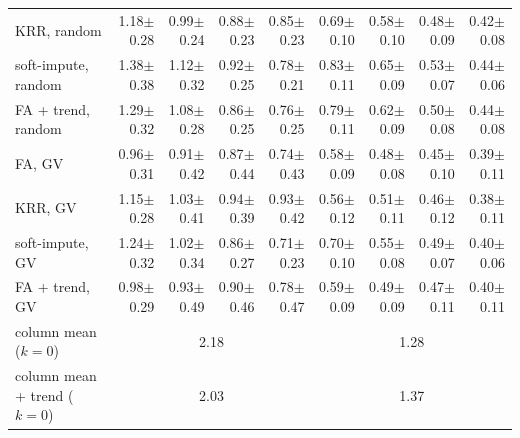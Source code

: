 \begin{tabular}{lrrrrrrrr}
KRR, random & 1.18{\tiny$\pm$0.28} & 0.99{\tiny$\pm$0.24} & 0.88{\tiny$\pm$0.23} & 0.85{\tiny$\pm$0.23} & 0.69{\tiny$\pm$0.10} & 0.58{\tiny$\pm$0.10} & 0.48{\tiny$\pm$0.09} & 0.42{\tiny$\pm$0.08} \\
soft-impute, random & 1.38{\tiny$\pm$0.38} & 1.12{\tiny$\pm$0.32} & 0.92{\tiny$\pm$0.25} & 0.78{\tiny$\pm$0.21} & 0.83{\tiny$\pm$0.11} & 0.65{\tiny$\pm$0.09} & 0.53{\tiny$\pm$0.07} & 0.44{\tiny$\pm$0.06} \\
FA + trend, random & 1.29{\tiny$\pm$0.32} & 1.08{\tiny$\pm$0.28} & 0.86{\tiny$\pm$0.25} & 0.76{\tiny$\pm$0.25} & 0.79{\tiny$\pm$0.11} & 0.62{\tiny$\pm$0.09} & 0.50{\tiny$\pm$0.08} & 0.44{\tiny$\pm$0.08} \\
FA, GV & 0.96{\tiny$\pm$0.31} & 0.91{\tiny$\pm$0.42} & 0.87{\tiny$\pm$0.44} & 0.74{\tiny$\pm$0.43} & 0.58{\tiny$\pm$0.09} & 0.48{\tiny$\pm$0.08} & 0.45{\tiny$\pm$0.10} & 0.39{\tiny$\pm$0.11} \\
KRR, GV & 1.15{\tiny$\pm$0.28} & 1.03{\tiny$\pm$0.41} & 0.94{\tiny$\pm$0.39} & 0.93{\tiny$\pm$0.42} & 0.56{\tiny$\pm$0.12} & 0.51{\tiny$\pm$0.11} & 0.46{\tiny$\pm$0.12} & 0.38{\tiny$\pm$0.11} \\
soft-impute, GV & 1.24{\tiny$\pm$0.32} & 1.02{\tiny$\pm$0.34} & 0.86{\tiny$\pm$0.27} & 0.71{\tiny$\pm$0.23} & 0.70{\tiny$\pm$0.10} & 0.55{\tiny$\pm$0.08} & 0.49{\tiny$\pm$0.07} & 0.40{\tiny$\pm$0.06} \\
FA + trend, GV & 0.98{\tiny$\pm$0.29} & 0.93{\tiny$\pm$0.49} & 0.90{\tiny$\pm$0.46} & 0.78{\tiny$\pm$0.47} & 0.59{\tiny$\pm$0.09} & 0.49{\tiny$\pm$0.09} & 0.47{\tiny$\pm$0.11} & 0.40{\tiny$\pm$0.11} \\
column mean ($k=0$) & \multicolumn{4}{c}{2.18} & \multicolumn{4}{c}{1.28} \\
column mean + trend ($k=0$) & \multicolumn{4}{c}{2.03} & \multicolumn{4}{c}{1.37} \\
\bottomrule
\end{tabular}
